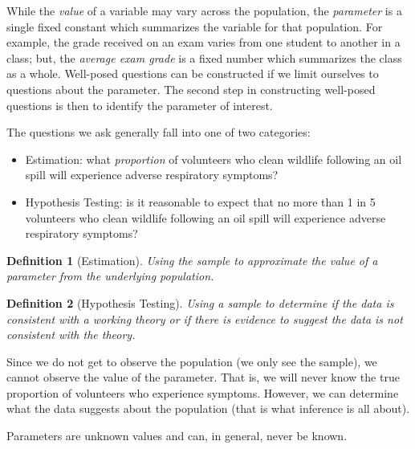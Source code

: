 \documentclass[
]{book}
\providecommand{\tightlist}{%
  \setlength{\itemsep}{0pt}\setlength{\parskip}{0pt}}
\theoremstyle{plain}
\theoremstyle{mydefn}
\newtheorem{definition}{Definition}[chapter]
\theoremstyle{myexmpl}
\theoremstyle{remark}
\begin{document}
While the \emph{value} of a variable may vary across the population, the \emph{parameter} is a single fixed constant which summarizes the variable for that population. For example, the grade received on an exam varies from one student to another in a class; but, the \emph{average exam grade} is a fixed number which summarizes the class as a whole. Well-posed questions can be constructed if we limit ourselves to questions about the parameter. The second step in constructing well-posed questions is then to identify the parameter of interest.

The questions we ask generally fall into one of two categories:

\begin{itemize}
\tightlist
\item
  Estimation: what \emph{proportion} of volunteers who clean wildlife following an oil spill will experience adverse respiratory symptoms?
\item
  Hypothesis Testing: is it reasonable to expect that no more than 1 in 5 volunteers who clean wildlife following an oil spill will experience adverse respiratory symptoms?
\end{itemize}

\begin{definition}[Estimation]
\protect\hypertarget{def:defn-estimation}{}{\label{def:defn-estimation} {} }Using the sample to approximate the value of a parameter from the underlying population.
\end{definition}

\begin{definition}[Hypothesis Testing]
\protect\hypertarget{def:defn-hypothesis-testing}{}{\label{def:defn-hypothesis-testing} {} }Using a sample to determine if the data is consistent with a working theory or if there is evidence to suggest the data is not consistent with the theory.
\end{definition}

Since we do not get to observe the population (we only see the sample), we cannot observe the value of the parameter. That is, we will never know the true proportion of volunteers who experience symptoms. However, we can determine what the data suggests about the population (that is what inference is all about).

\begin{rmdkeyidea}
Parameters are unknown values and can, in general, never be known.\\
\end{rmdkeyidea}
\end{document}

